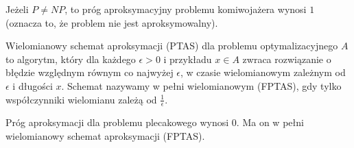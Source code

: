 \begin{twierdzenie}
    Jeżeli $P \neq NP$, to próg aproksymacyjny problemu komiwojażera wynosi $1$ (oznacza to, że problem nie jest aproksymowalny).
\end{twierdzenie}

\begin{definicja}
    Wielomianowy schemat aproksymacji (PTAS) dla problemu optymalizacyjnego $A$ to algorytm, który dla każdego $\epsilon > 0$ i przykładu $x \in A$ zwraca rozwiązanie o błędzie względnym równym co najwyżej $\epsilon$, w czasie wielomianowym zależnym od $\epsilon$ i długości $x$. Schemat nazywamy w pełni wielomianowym (FPTAS), gdy tylko współczynniki wielomianu zależą od $\frac{1}{\epsilon}$.
\end{definicja}

\begin{twierdzenie}
    Próg aproksymacji dla problemu plecakowego wynosi $0$. Ma on w pełni wielomianowy schemat aproksymacji (FPTAS).
\end{twierdzenie}